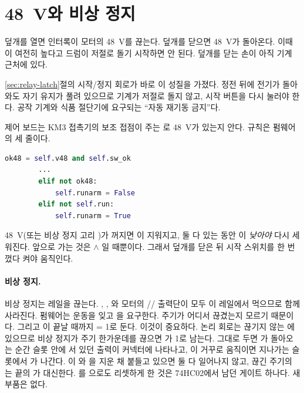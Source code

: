 \section{48~V와 비상 정지}\label{sec:gk-safety}

\Why 덮개를 열면 인터록이 모터의 48~V를 끊는다. 덮개를 닫으면 48~V가 돌아온다. 이때 이 여전히 높다고 드럼이 저절로
돌기 시작하면 안 된다. 덮개를 닫는 손이 아직 기계 근처에 있다.

\General \ref{sec:relay-latch}절의 시작/정지 회로가 바로 이 성질을 가졌다. 정전 뒤에 전기가 돌아와도 자기 유지가 풀려 있으므로
기계가 저절로 돌지 않고, 시작 버튼을 다시 눌러야 한다. 공작 기계와 식품 절단기에 요구되는 ``자동 재기동 금지''다.

\Ours 제어 보드는 KM3 접촉기의 보조 접점이 주는 로 48~V가 있는지 안다. 규칙은 펌웨어의 세 줄이다.

\begin{lstlisting}[language=Python,caption={\code{firmware\_model.py}: 48~V 복귀 규칙(\code{RUNARM}).},label={lst:gk-runarm}]
        ok48 = self.v48 and self.sw_ok
        ...
        elif not ok48:
            self.runarm = False
        elif not self.run:
            self.runarm = True
\end{lstlisting}

48~V(또는 비상 정지 고리 )가 꺼지면 이 지워지고, 둘 다 있는 동안 이 \emph{낮아야} 다시 세워진다.
앞으로 가는 것은  $\wedge$ 일 때뿐이다. 그래서 덮개를 닫은 뒤 시작 스위치를 한 번 껐다 켜야 움직인다.

\paragraph{비상 정지.} 비상 정지는  레일을 끊는다. , , 와 모터의 //
출력단이 모두 이 레일에서 먹으므로 함께 사라진다. 펌웨어는 운동을 잊고 을 요구한다. 주기가 어디서 끊겼는지 모르기
때문이다. 그리고 이 끝날 때까지  = 1로 둔다. 이것이 중요하다. 논리 회로는 끊기지 않는 에 있으므로
비상 정지가 주기 한가운데를 끊으면 가 1로 남는다. 그대로 두면 가 돌아오는 순간 슬롯 안에 서 있던
출력이 커넥터에 나타나고, 이 거꾸로 움직이면 지나가는  슬롯에서 가 나간다. 이
와 을 지운 채 붙들고 있으면 둘 다 일어나지 않고, 끊긴 주기의 는  끝의 가
대신한다. 를 으로도 리셋하게 한 것은 74HC02에서 남던 게이트 하나다. 새 부품은 없다.

